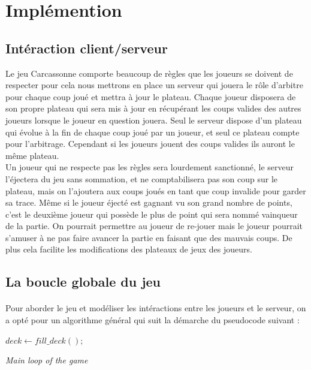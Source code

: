 \documentclass[12pt]{article}
\begin{document}
\section{Implémention} 

\subsection{Intéraction client/serveur}

Le jeu Carcassonne comporte beaucoup de règles que les joueurs se doivent de respecter pour cela nous mettrons en place un serveur qui jouera le rôle d'arbitre pour chaque coup joué et mettra à jour le plateau. Chaque joueur disposera de son propre plateau qui sera mis à jour en récupérant les coups valides des autres joueurs lorsque le joueur en question jouera. Seul le serveur dispose d'un plateau qui évolue à la fin de chaque coup joué par un joueur, et seul ce plateau compte pour l'arbitrage. Cependant si les joueurs jouent des coups valides ils auront le même plateau.\\

Un joueur qui ne respecte pas les règles sera lourdement sanctionné, le serveur l'éjectera du jeu sans sommation, et ne comptabilisera pas son coup sur le plateau, mais on l'ajoutera aux coups joués en tant que coup invalide pour garder sa trace. Même si le joueur éjecté est gagnant vu son grand nombre de points, c'est le deuxième joueur qui possède le plus de point qui sera nommé vainqueur de la partie. On pourrait permettre au joueur de re-jouer mais le joueur pourrait s'amuser à ne pas faire avancer la partie en faisant que des mauvais coups. De plus cela facilite les modifications des plateaux de jeux des joueurs.

\subsection{La boucle globale du jeu}

\paragraph{} Pour aborder le jeu et modéliser les intéractions entre les joueurs et le serveur, on a opté pour un algorithme général qui suit la démarche du pseudocode suivant :

\LinesNumbered
\DontPrintSemicolon
\begin{algorithm}
{$deck \leftarrow fill\_deck();$}\\
\caption{\textit{Main loop of the game}} \label{1}
\end{algorithm}
\end{document}
